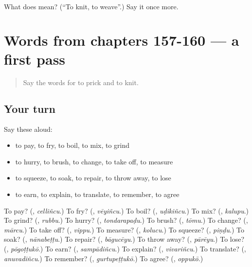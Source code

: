 \begin{tcolorbox}[breakable,colback=teal!4,colframe=teal!35!black,title={Before you move on}]
What does  mean? (\textquotedblleft{}To knit, to weave\textquotedblright{}.) Say it once more.
\end{tcolorbox}
\section[(dialogue)]{Words from chapters 157-160 — a first pass}

\label{lesson:TE-R165-first-pass-words-from-chapters-157-160}



\begin{quote}
Say the words for to prick and to knit.
\end{quote}

\subsection*{Your turn}
Say these aloud:

\begin{itemize}
\raggedright
  \item to pay, to fry, to boil, to mix, to grind
  \item to hurry, to brush, to change, to take off, to measure
  \item to squeeze, to soak, to repair, to throw away, to lose
  \item to earn, to explain, to translate, to remember, to agree
\end{itemize}

\begin{tcolorbox}[breakable,colback=teal!4,colframe=teal!35!black,title={Before you move on}]
To pay? (\textbf{}, \emph{celliñcu}.) To fry? (\textbf{}, \emph{vēyiñcu}.) To boil? (\textbf{}, \emph{uḍikiñcu}.) To mix? (\textbf{}, \emph{kalupu}.) To grind? (\textbf{}, \emph{rubbu}.) To hurry? (\textbf{}, \emph{tondarapaḍu}.) To brush? (\textbf{}, \emph{tōmu}.) To change? (\textbf{}, \emph{mārcu}.) To take off? (\textbf{}, \emph{vippu}.) To measure? (\textbf{}, \emph{kolucu}.) To squeeze? (\textbf{}, \emph{piṇḍu}.) To soak? (\textbf{}, \emph{nānabeṭṭu}.) To repair? (\textbf{}, \emph{bāgucēyu}.) To throw away? (\textbf{}, \emph{pārēyu}.) To lose? (\textbf{}, \emph{pōgoṭṭukō}.) To earn? (\textbf{}, \emph{sampādiñcu}.) To explain? (\textbf{}, \emph{vivariñcu}.) To translate? (\textbf{}, \emph{anuvadiñcu}.) To remember? (\textbf{}, \emph{gurtupeṭṭukō}.) To agree? (\textbf{}, \emph{oppukō}.)
\end{tcolorbox}
